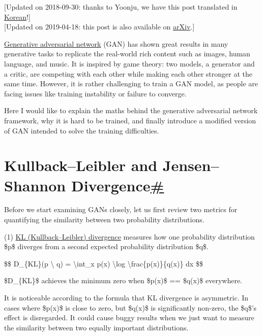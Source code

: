 {{[}Updated on 2018-09-30: thanks to Yoonju, we have this post translated in \href{https://github.com/yjucho1/articles/blob/master/fromGANtoWGAN/readme.md}{Korean}!{]}}\\
{{[}Updated on 2019-04-18: this post is also available on \href{https://arxiv.org/abs/1904.08994}{arXiv}.{]}}

\href{https://arxiv.org/pdf/1406.2661.pdf}{Generative adversarial network} (GAN) has shown great results in many generative tasks to replicate the real-world rich content such as images, human language, and music. It is inspired by game theory: two models, a generator and a critic, are competing with each other while making each other stronger at the same time. However, it is rather challenging to train a GAN model, as people are facing issues like training instability or failure to converge.

Here I would like to explain the maths behind the generative adversarial network framework, why it is hard to be trained, and finally introduce a modified version of GAN intended to solve the training difficulties.

\section{\texorpdfstring{Kullback--Leibler and Jensen--Shannon Divergence\hyperref[kullbackleibler-and-jensenshannon-divergence]{\#}}{Kullback--Leibler and Jensen--Shannon Divergence\#}}\label{kullbackleibler-and-jensenshannon-divergence}

Before we start examining GANs closely, let us first review two metrics for quantifying the similarity between two probability distributions.

(1) \href{https://en.wikipedia.org/wiki/Kullback\%E2\%80\%93Leibler_divergence}{KL (Kullback--Leibler) divergence} measures how one probability distribution \$p\$ diverges from a second expected probability distribution \$q\$.

\$\$ D\_\{KL\}(p \textbackslash\textbar{} q) = \textbackslash int\_x p(x) \textbackslash log \textbackslash frac\{p(x)\}\{q(x)\} dx \$\$

\$D\_\{KL\}\$ achieves the minimum zero when \$p(x)\$ == \$q(x)\$ everywhere.

It is noticeable according to the formula that KL divergence is asymmetric. In cases where \$p(x)\$ is close to zero, but \$q(x)\$ is significantly non-zero, the \$q\$'s effect is disregarded. It could cause buggy results when we just want to measure the similarity between two equally important distributions.

